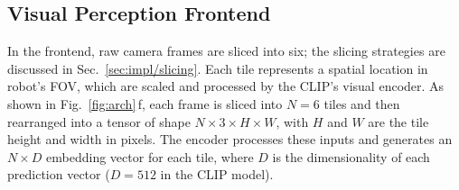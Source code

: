 



\subsection{Visual Perception Frontend}
In the frontend, raw camera frames are sliced into six; the slicing strategies are discussed in Sec.~\ref{sec:impl/slicing}. Each tile represents a spatial location in robot's FOV, which are scaled and processed by the CLIP's visual encoder. As shown in Fig.~\ref{fig:arch}\,f, each frame is sliced into $N=6$ tiles and then rearranged into a tensor of shape $N\times 3 \times H \times W$, with $H$ and $W$ are the tile height and width in pixels. The encoder processes these inputs and generates an $N\times D$ embedding vector for each tile, where $D$ is the dimensionality of each prediction vector ($D=512$ in the CLIP model).

